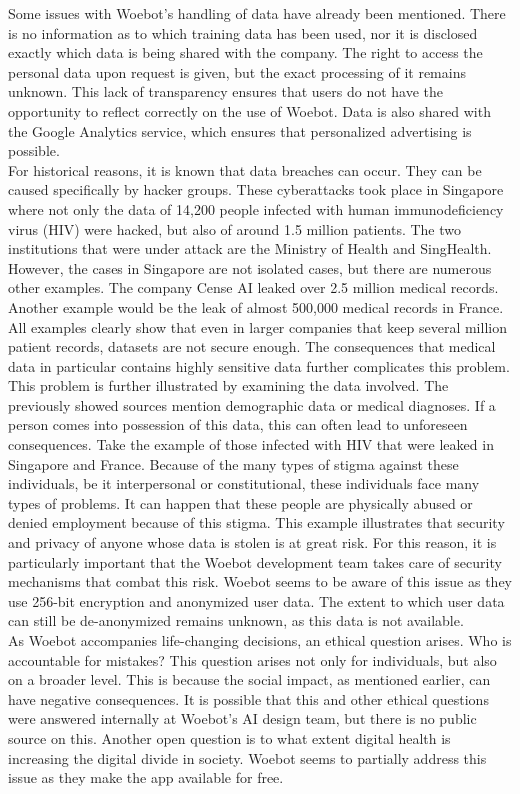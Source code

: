 Some issues with Woebot's handling of data have already been mentioned.
There is no information as to which training data has been used, nor it is disclosed exactly which data is being shared with the company.
The right to access the personal data upon request is given, but the exact processing of it remains unknown.
This lack of transparency ensures that users do not have the opportunity to reflect correctly on the use of Woebot.
Data is also shared with the Google Analytics service, which ensures that personalized advertising is possible\cite{woebot-privacy}.\\

For historical reasons, it is known that data breaches can occur.
They can be caused specifically by hacker groups.
These cyberattacks took place in Singapore where not only the data of 14,200 people infected with human immunodeficiency virus (HIV) were hacked, but also of around 1.5 million patients\cite{hiv-singapore}.
The two institutions that were under attack are the Ministry of Health and SingHealth.
However, the cases in Singapore are not isolated cases, but there are numerous other examples.
The company Cense AI leaked over 2.5 million medical records\cite{pcmag-leak}.
Another example would be the leak of almost 500,000 medical records in France\cite{france-leak}.
All examples clearly show that even in larger companies that keep several million patient records, datasets are not secure enough.
The consequences that medical data in particular contains highly sensitive data further complicates this problem.\\

This problem is further illustrated by examining the data involved.
The previously showed sources mention demographic data or medical diagnoses.
If a person comes into possession of this data, this can often lead to unforeseen consequences.
Take the example of those infected with HIV that were leaked in Singapore and France.
Because of the many types of stigma against these individuals, be it interpersonal or constitutional, these individuals face many types of problems\cite{stigma-hiv}.
It can happen that these people are physically abused or denied employment because of this stigma.
This example illustrates that security and privacy of anyone whose data is stolen is at great risk.
For this reason, it is particularly important that the Woebot development team takes care of security mechanisms that combat this risk.
Woebot seems to be aware of this issue as they use 256-bit encryption and anonymized user data\cite{woebot-security}.
The extent to which user data can still be de-anonymized remains unknown, as this data is not available.\\

As Woebot accompanies life-changing decisions, an ethical question arises.
Who is accountable for mistakes?
This question arises not only for individuals, but also on a broader level.
This is because the social impact, as mentioned earlier, can have negative consequences.
It is possible that this and other ethical questions were answered internally at Woebot's AI design team, but there is no public source on this.
Another open question is to what extent digital health is increasing the digital divide in society.
Woebot seems to partially address this issue as they make the app available for free.
